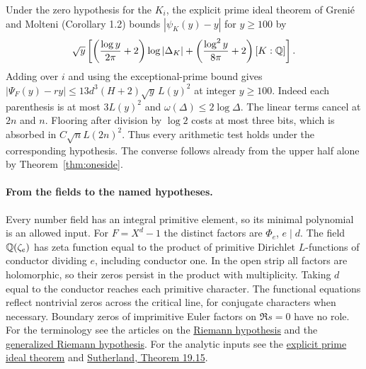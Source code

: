 Under the zero hypothesis for the $K_i$, the explicit prime ideal theorem of Greni\'e and Molteni (Corollary 1.2) bounds $|\psi_K(y)-y|$ for $y\ge100$ by
\[
 \sqrt y\left[\left(\frac{\log y}{2\pi}+2\right)\log|\Delta_K|
          +\left(\frac{\log^2 y}{8\pi}+2\right)[K:\mathbb Q]\right].
\]
Adding over $i$ and using the exceptional-prime bound gives
$|\Psi_F(y)-ry|\le13d^3(H+2)\sqrt y\,L(y)^2$ at integer $y\ge100$.
Indeed each parenthesis is at most $3L(y)^2$ and $\omega(\Delta)\le2\log\Delta$.
The linear terms cancel at $2n$ and $n$. Flooring after division by $\log 2$ costs at most three bits, which is absorbed in $C\sqrt n L(2n)^2$. Thus every arithmetic test holds under the corresponding hypothesis. The converse follows already from the upper half alone by Theorem~\ref{thm:oneside}.

\paragraph{From the fields to the named hypotheses.}
Every number field has an integral primitive element, so its minimal polynomial is an allowed input. For $F=X^d-1$ the distinct factors are $\Phi_e$, $e\mid d$. The field $\mathbb Q(\zeta_e)$ has zeta function equal to the product of primitive Dirichlet $L$-functions of conductor dividing $e$, including conductor one. In the open strip all factors are holomorphic, so their zeros persist in the product with multiplicity. Taking $d$ equal to the conductor reaches each primitive character. The functional equations reflect nontrivial zeros across the critical line, for conjugate characters when necessary. Boundary zeros of imprimitive Euler factors on $\Re s=0$ have no role. For the terminology see the articles on the \href{https://en.wikipedia.org/wiki/Riemann_hypothesis}{Riemann hypothesis} and the \href{https://en.wikipedia.org/wiki/Generalized_Riemann_hypothesis}{generalized Riemann hypothesis}. For the analytic inputs see the \href{https://arxiv.org/abs/1312.4463}{explicit prime ideal theorem} and \href{https://math.mit.edu/classes/18.785/2018fa/LectureNotes19.pdf}{Sutherland, Theorem 19.15}.
